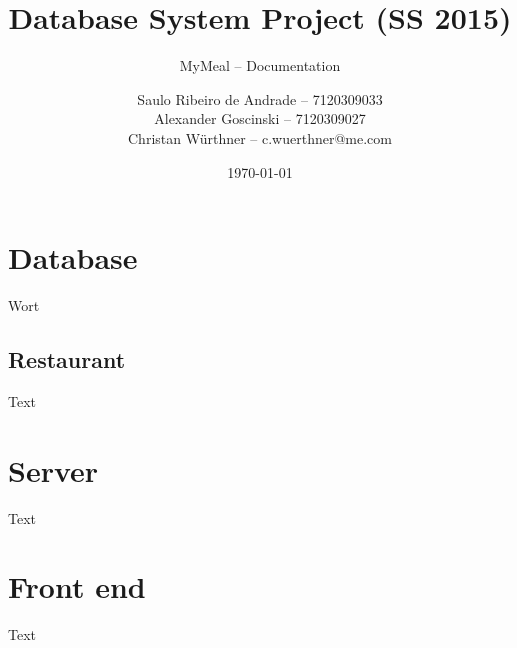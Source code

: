 \documentclass[parskip=half, a4paper, DIV=14]{scrartcl}
\begin{document}
\title{Database System Project (SS 2015)}
\subtitle{MyMeal -- Documentation}
\author{Saulo Ribeiro de Andrade -- 7120309033\\
		Alexander Goscinski -- 7120309027\\
		Christan Würthner -- c.wuerthner@me.com}
\date{\today}
\maketitle

\tableofcontents
\newpage


\section{Database}
Wort
\subsection{Restaurant}
Text
\section{Server}
Text
\section{Front end}
Text
\end{document}

